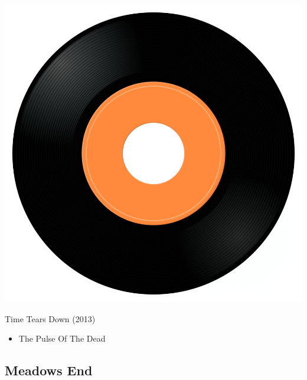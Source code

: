 \begin{minipage}[t]{0.25\textwidth}\vspace{0pt}
\captionsetup{type=figure}
\includegraphics[width=\textwidth]{Images/cover.png}
\caption*{Time Tears Down (2013)}
\end{minipage}
\begin{minipage}[t]{0.25\textwidth}\vspace{0pt}
\begin{itemize}[nosep,leftmargin=1em,labelwidth=*,align=left]
	\setlength{\itemsep}{0pt}
	\item The Pulse Of The Dead
\end{itemize}
\end{minipage}

\subsection{Meadows End}

